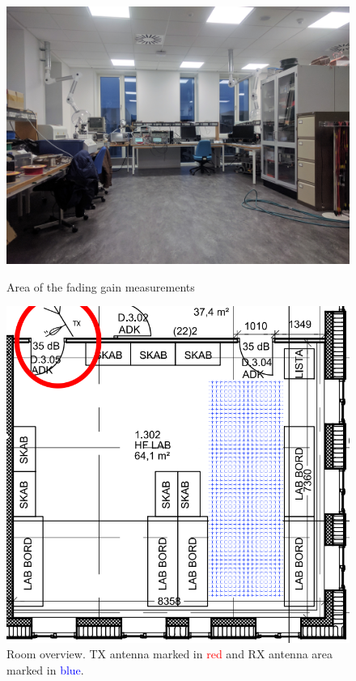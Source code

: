 \begin{figure}[H]
  \centering
  \begin{minipage}[H]{0.4\textwidth}
    \includegraphics[width=\textwidth]{pictures/Measurement/walking_meas.jpg}
    \caption{Area of the fading gain measurements}
    \label{walk_area}
  \end{minipage}
  \hfill
  \begin{minipage}[H]{0.5\textwidth}
    \includegraphics[width=\textwidth]{figures/HFLABmarked.png}
    \caption{Room overview. TX antenna marked in \textcolor{red}{red} and RX antenna area marked in \textcolor{blue}{blue}.}
  \end{minipage}
\end{figure}

